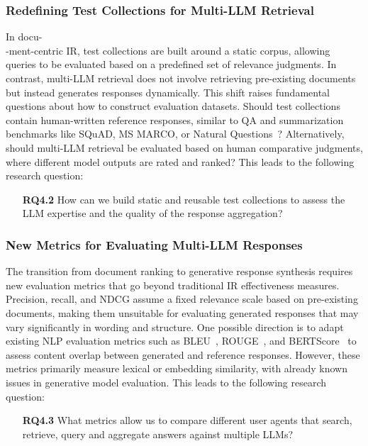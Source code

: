 \subsubsection{Redefining Test Collections for Multi-LLM Retrieval}
In docu-\\-ment-centric IR, test collections are built around a static corpus, allowing queries to be evaluated based on a predefined set of relevance judgments. In contrast, multi-LLM retrieval does not involve retrieving pre-existing documents but instead generates responses dynamically. This shift raises fundamental questions about how to construct evaluation datasets. Should test collections contain human-written reference responses, similar to QA and summarization benchmarks like SQuAD, MS MARCO, or Natural Questions~\cite{Rajpurkar2016SQuAD, Bajaj2018MSMARCO}? Alternatively, should multi-LLM retrieval be evaluated based on human comparative judgments, where different model outputs are rated and ranked? This leads to the following research question:

\begin{itemize}
    \item [\textbf{RQ4.2}] How can we build static and reusable test collections to assess the LLM expertise and the quality of the response aggregation?
\end{itemize}

\subsubsection{New Metrics for Evaluating Multi-LLM Responses}
The transition from document ranking to generative response synthesis requires new evaluation metrics that go beyond traditional IR effectiveness measures. Precision, recall, and NDCG assume a fixed relevance scale based on pre-existing documents, making them unsuitable for evaluating generated responses that may vary significantly in wording and structure. One possible direction is to adapt existing NLP evaluation metrics such as BLEU~\cite{Papineni2002BLEU}, ROUGE~\cite{Lin2004ROUGE}, and BERTScore~\cite{Zhang2019BERTScore} to assess content overlap between generated and reference responses. However, these metrics primarily measure lexical or embedding similarity, with already known issues in generative model evaluation. This leads to the following research question:

\begin{itemize}
    \item[\textbf{RQ4.3}] What metrics allow us to compare different user agents that search, retrieve, query and aggregate answers against multiple LLMs? 
\end{itemize}

